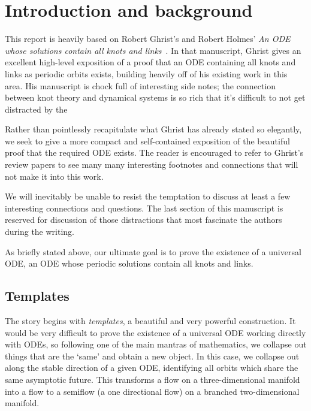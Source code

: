 \documentclass[paper.tex]{subfiles}
\begin{document}
\section{Introduction and background}


This report is heavily based on Robert Ghrist's and Robert Holmes' \emph{An ODE whose solutions contain all knots and links}~\cite{knottyode}.
 In that manuscript, Ghrist gives an excellent high-level exposition of a proof that an ODE containing
all knots and links as periodic orbits exists, building heavily off of his existing work in this area. His manuscript is chock full of interesting side notes; the connection between knot theory and dynamical systems is so rich
that it's difficult to not get distracted by the

Rather than pointlessly recapitulate what Ghrist has already stated so elegantly, we seek to give a more compact and self-contained exposition of the beautiful proof that the required ODE exists. The reader is encouraged to
refer to Ghrist's review papers \cite{knottyode}\cite{chaoticknots}to see many many interesting footnotes and connections that will not make it into this work.

We will inevitably be unable to resist the temptation to discuss at least a few interesting connections and questions. The last section of this manuscript is reserved for discussion of those distractions that most fascinate the
authors during the writing.

As briefly stated above, our ultimate goal is to prove the existence of a universal ODE, an ODE whose periodic solutions contain all knots and links.


\subsection{Templates}

The story begins with \emph{templates}, a beautiful and very powerful construction. It would be very difficult to prove the existence of a universal ODE working directly with ODEs, so following one of the main mantras
of mathematics, we collapse out things that are the `same' and obtain a new object. In this case, we collapse out along the stable direction of a given ODE, identifying all orbits which share the same asymptotic future.
This transforms a flow on a three-dimensional manifold into a flow to a semiflow (a one directional flow) on a branched two-dimensional manifold.
\end{document}
